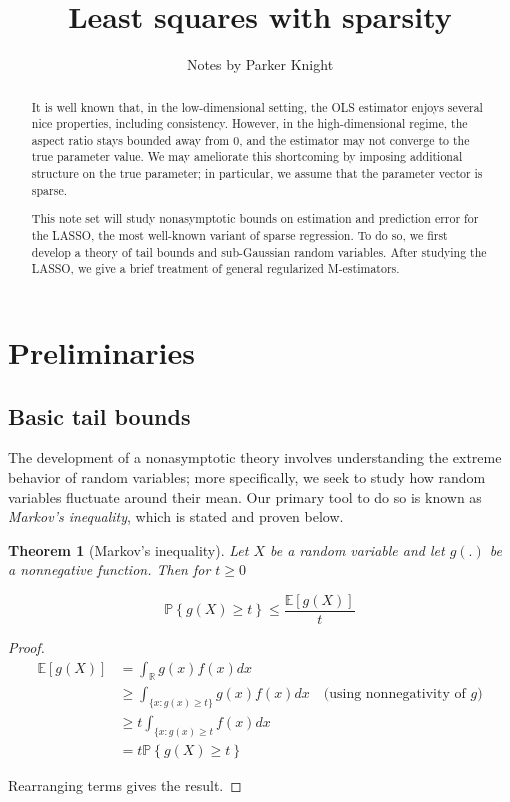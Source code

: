 \documentclass{article}
\title{Least squares with sparsity}
\author{Notes by Parker Knight}
\newcommand{\R}{\mathbb{R}}
\newcommand{\ev}[1]{\mathbb{E}\left[#1\right]}
\newcommand{\prob}[1]{\mathbb{P}\left\{#1\right\}}
\newtheorem{theorem}{Theorem}
\begin{document}
\maketitle

\begin{abstract}
	It is well known that, in the low-dimensional setting, the OLS estimator
	enjoys several nice properties, including consistency. However, in the
	high-dimensional regime, the aspect ratio stays bounded away from 0, and
	the estimator may not converge to the true parameter value. We may
	ameliorate this shortcoming by imposing additional structure on the true
	parameter; in particular, we assume that the parameter vector is sparse.

	This note set will study nonasymptotic bounds on estimation and
	prediction error for the LASSO, the most well-known variant of sparse regression. To do so, we first develop a
	theory of tail bounds and sub-Gaussian random variables. After studying
	the LASSO, we give a brief treatment of general regularized M-estimators.
\end{abstract}

\section{Preliminaries}

\subsection{Basic tail bounds}

The development of a nonasymptotic theory involves understanding the extreme
behavior of random variables; more specifically, we seek to study how random
variables fluctuate around their mean. Our primary tool to do so is known as
\textit{Markov's inequality}, which is stated and proven below.

\begin{theorem}[Markov's inequality]
	Let $X$ be a random variable and let $g(.)$ be a
	nonnegative function. Then for $t \geq 0$

	$$\prob{g(X) \geq t} \leq \frac{\ev{g(X)}}{t}$$
\end{theorem}

\begin{proof}
	\begin{align*}
		\ev{g(X)} &= \int_{\R}g(x)f(x)dx \\ 
		&\geq \int_{\{x: g(x) \geq t\}}g(x)f(x)dx \quad \textrm{(using nonnegativity of $g$)} \\
		&\geq t\int_{\{x : g(x) \geq t}f(x)dx \\
		&= t\prob{g(X) \geq t}
	\end{align*}

	Rearranging terms gives the result.
\end{proof}
\end{document}
